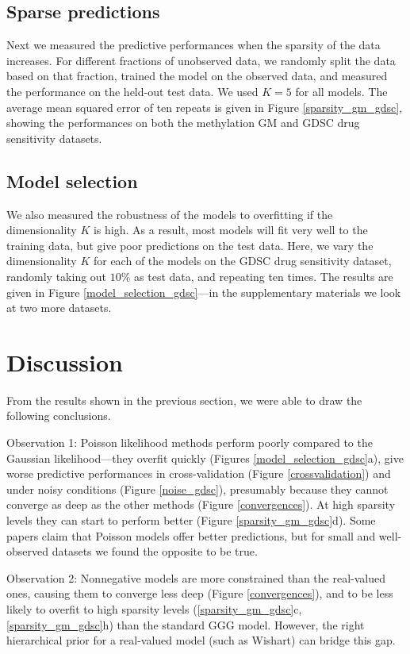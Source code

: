 \documentclass[letterpaper]{article} %
\begin{document}
	\subsection{Sparse predictions}
		Next we measured the predictive performances when the sparsity of the data increases. For different fractions of unobserved data, we randomly split the data based on that fraction, trained the model on the observed data, and measured the performance on the held-out test data. We used $K=5$ for all models.
		The average mean squared error of ten repeats is given in Figure \ref{sparsity_gm_gdsc}, showing the performances on both the methylation GM and GDSC drug sensitivity datasets.
	
	\subsection{Model selection}
		We also measured the robustness of the models to overfitting if the dimensionality $K$ is high. As a result, most models will fit very well to the training data, but give poor predictions on the test data. Here, we vary the dimensionality $K$ for each of the models on the GDSC drug sensitivity dataset, randomly taking out $10\%$ as test data, and repeating ten times.
		The results are given in Figure \ref{model_selection_gdsc}---in the supplementary materials we look at two more datasets.
		

\section{Discussion} \label{Discussion}
	From the results shown in the previous section, we were able to draw the following conclusions. 
	
	Observation 1: Poisson likelihood methods perform poorly compared to the Gaussian likelihood---they overfit quickly (Figures \ref{model_selection_gdsc}a), give worse predictive performances in cross-validation (Figure \ref{crossvalidation}) and under noisy conditions (Figure \ref{noise_gdsc}), presumably because they cannot converge as deep as the other methods (Figure \ref{convergences}). At high sparsity levels they can start to perform better (Figure \ref{sparsity_gm_gdsc}d). Some papers \cite{Gopalan2015} claim that Poisson models offer better predictions, but for small and well-observed datasets we found the opposite to be true. 
	
	Observation 2: Nonnegative models are more constrained than the real-valued ones, causing them to converge less deep (Figure \ref{convergences}), and to be less likely to overfit to high sparsity levels (\ref{sparsity_gm_gdsc}c, \ref{sparsity_gm_gdsc}h) than the standard GGG model. However, the right hierarchical prior for a real-valued model (such as Wishart) can bridge this gap.
	
\end{document}
